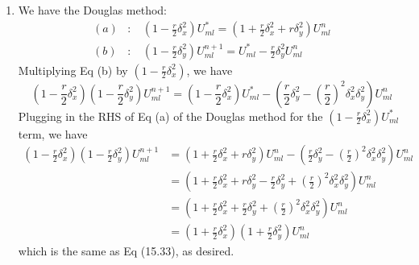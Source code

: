 \documentclass[11pt]{article}
\def\f{\frac }
\begin{document}
\begin{enumerate}
\item We have the Douglas method:
\begin{align*} (a) &: ~~~~ \left ( 1 - \f{r}{2}\delta _x ^2 \right ) U^* _{ml} = \left ( 1  + \f{r}{2} \delta _x ^2 + r \delta _y ^2 \right ) U^n _{ml} \\
(b) &: ~~~~ \left ( 1 - \f{r}{2}\delta _y ^2  \right ) U^{n+1}  _{ml} = U^* _{ml} - \f{r}{2} \delta _y ^2 U^n _{ml} \end{align*} 
Multiplying Eq (b) by $\left ( 1 - \f{r}{2}\delta _x ^2 \right )$, we have
\[ \left ( 1 - \f{r}{2}\delta _x ^2 \right ) \left ( 1 - \f{r}{2}\delta _y ^2  \right ) U^{n+1}  _{ml} = \left ( 1 - \f{r}{2}\delta _x ^2 \right )U^* _{ml} - \left ( \f{r}{2} \delta _y ^2 - \left ( \f{r}{2} \right ) ^ 2 \delta _x ^2 \delta _y ^2\right ) U^n _{ml} \]
Plugging in the RHS of Eq (a) of the Douglas method for the $\left ( 1 - \f{r}{2}\delta _x ^2 \right ) U^* _{ml}$ term, we have
\begin{align*}  \left ( 1 - \f{r}{2}\delta _x ^2 \right ) \left ( 1 - \f{r}{2}\delta _y ^2  \right ) U^{n+1}  _{ml} &= \left ( 1  + \f{r}{2} \delta _x ^2 + r \delta _y ^2 \right ) U^n _{ml} - \left ( \f{r}{2} \delta _y ^2 - \left ( \f{r}{2} \right ) ^ 2 \delta _x ^2 \delta _y ^2\right ) U^n _{ml} \\
&= \left ( 1  + \f{r}{2} \delta _x ^2 + r \delta _y ^2  - \f{r}{2} \delta _y ^2 + \left ( \f{r}{2} \right ) ^ 2 \delta _x ^2 \delta _y ^2\right ) U^n _{ml} \\
&= \left ( 1  + \f{r}{2} \delta _x ^2 + \f{r}{2} \delta _y ^2 + \left ( \f{r}{2} \right ) ^ 2 \delta _x ^2 \delta _y ^2\right ) U^n _{ml} \\
&= \left ( 1  + \f{r}{2} \delta _x ^2  \right ) \left ( 1 + \f{r}{2} \delta _y ^2 \right ) U^n _{ml} \end{align*}
which is the same as Eq (15.33), as desired.


\end{enumerate}
\end{document}
